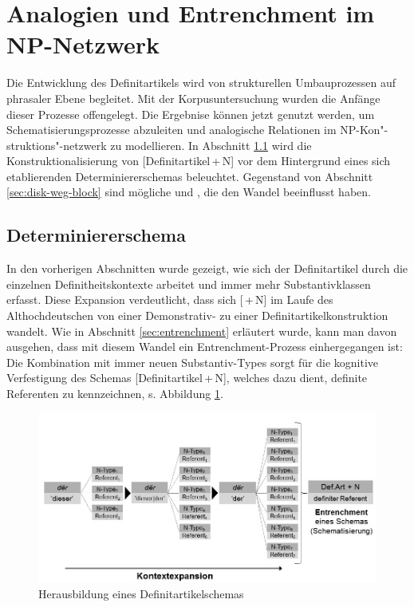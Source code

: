 \section{Analogien und Entrenchment im NP-Netzwerk} \label{sec:disk-ana-entrench}

Die Entwicklung des Definitartikels wird von strukturellen Umbauprozessen auf phrasaler Ebene begleitet. Mit der Korpusuntersuchung wurden die Anfänge dieser Prozesse offengelegt. Die Ergebnise können jetzt genutzt werden, um Schematisierungsprozesse abzuleiten und analogische Relationen im NP-Kon"-struktions"-netzwerk zu modellieren. In Abschnitt \ref{sec:disk-schema} wird die Konstruktionalisierung von [Definitartikel\,+\,N] vor dem Hintergrund eines sich etablierenden Determiniererschemas beleuchtet. Gegenstand von Abschnitt \ref{sec:disk-weg-block} sind mögliche  und , die den Wandel beeinflusst haben.  

\subsection{Determiniererschema} \label{sec:disk-schema}

In den vorherigen Abschnitten wurde gezeigt, wie sich der Definitartikel durch die einzelnen Definitheitskontexte arbeitet und immer mehr Substantivklassen erfasst. Diese Expansion verdeutlicht, dass sich [\,+\,N] im Laufe des Althochdeutschen von einer Demonstrativ- zu einer Definitartikelkonstruktion wandelt. 
Wie in Abschnitt \ref{sec:entrenchment} erläutert wurde, kann man davon ausgehen, dass mit diesem Wandel ein Entrenchment-Prozess einhergegangen ist: Die Kombination mit immer neuen Substantiv-Types  sorgt für die kognitive Verfestigung des Schemas [Definitartikel\,+\,N], welches dazu dient, definite Referenten zu kennzeichnen, s. Abbildung \ref{abb:entrenchment-ther}. 

\begin{figure}
\begin{center}
  \includegraphics[width=12cm]{images/entrenchment-def-N-neu-sw.jpg}
\caption {Herausbildung eines Definitartikelschemas} 
\label{abb:entrenchment-ther}
\end{center}
\end{figure} 


